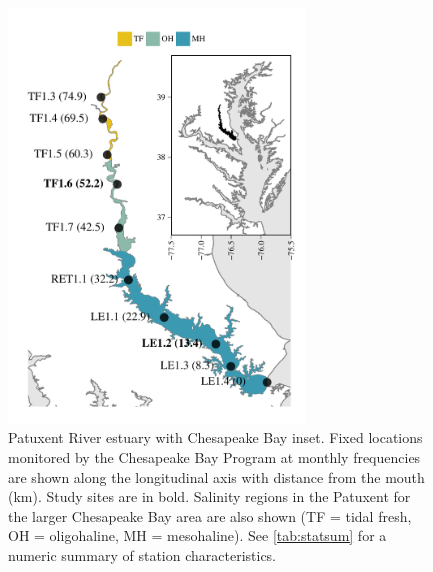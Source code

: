\documentclass[letterpaper,12pt,oneside]{article}\usepackage[]{graphicx}\usepackage[]{color}
\begin{document}



\begin{figure}[!ht]

{\centering \includegraphics[width=0.7\textwidth]{figs/map-1} 

}

\caption{Patuxent River estuary with Chesapeake Bay inset. Fixed locations monitored by the Chesapeake Bay Program at monthly frequencies are shown along the longitudinal axis with distance from the mouth (km).  Study sites are in bold. Salinity regions in the Patuxent for the larger Chesapeake Bay area are also shown (TF = tidal fresh, OH = oligohaline, MH = mesohaline). See \cref{tab:statsum} for a numeric summary of station characteristics.}\label{fig:map}
\end{figure}
\end{document}
